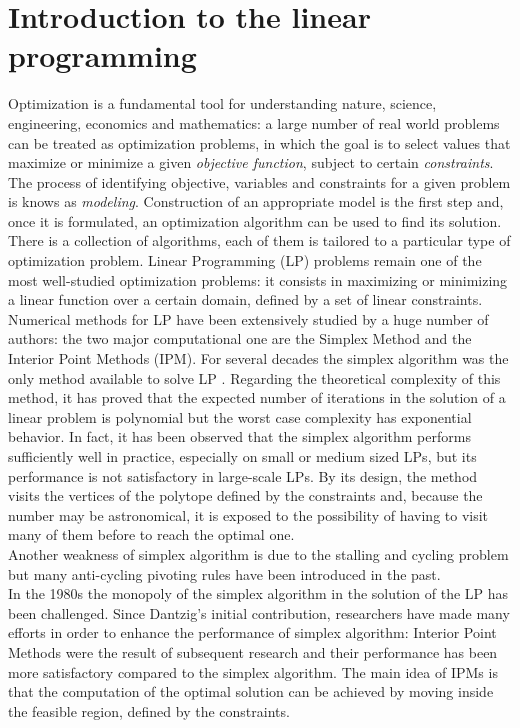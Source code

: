 \documentclass[a4paper,10 pt,titlepage,twoside]{book}
\theoremstyle{plain}
\theoremstyle{definition}
\theoremstyle{remark}
\begin{document}
\chapter{Introduction to the linear programming}
Optimization is a fundamental tool for understanding nature, science, engineering, economics and mathematics: a large number of real world problems can be treated as optimization problems, in which the goal is to select values that maximize or minimize a given \textit{objective function}, subject to certain \textit{constraints}.\\ The process of identifying objective, variables and constraints for a given problem is knows as \textit{modeling}. Construction of an appropriate model is the first step and, once it is formulated, an optimization algorithm can be used to find its solution.\\ There is a collection of algorithms, each of them is tailored to a particular type of optimization problem. Linear Programming (LP) problems remain one of the most well-studied optimization problems: it consists in maximizing or minimizing a linear function over a certain domain, defined by a set of linear constraints.\\
Numerical methods for LP have been extensively studied by a huge number of authors: the two major computational one are the Simplex Method and the Interior Point Methods (IPM).
For several decades the simplex algorithm was the only method available to solve LP \cite{1}. Regarding the theoretical complexity of this method, it has proved that the expected number of iterations in the solution of a linear problem is polynomial but the worst case complexity has exponential behavior. In fact, it has been observed that the simplex algorithm performs sufficiently well in practice, especially on small or medium sized LPs, but its performance is not satisfactory in large-scale LPs. By its design, the method visits the vertices of the polytope defined by the constraints and, because the number may be astronomical, it is exposed to the possibility of having to visit many of them before to reach the optimal one.\\ Another weakness of simplex algorithm is due to the stalling and cycling problem but many anti-cycling pivoting rules have been introduced in the past.\\
In the 1980s the monopoly of the simplex algorithm in the solution of the LP has been challenged. Since Dantzig's initial contribution, researchers have made many efforts in order to enhance the performance of simplex algorithm: Interior Point Methods were the result of subsequent research and their performance has been more satisfactory compared to the simplex algorithm. The main idea of IPMs is that the computation of the optimal solution can be achieved by moving inside the feasible region, defined by the constraints.\\
\end{document}
